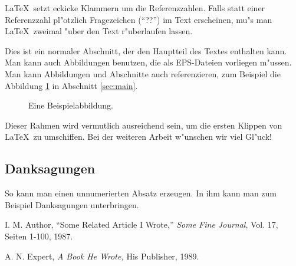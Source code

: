 \documentclass[10pt,twocolumn]{article}
\begin{document}
\LaTeX\ setzt eckicke Klammern um die Referenzzahlen. Falls 
statt einer Referenzzahl pl"otzlich Fragezeichen (``??'') im Text
erscheinen, mu"s man \LaTeX\ zweimal "uber den Text r"uberlaufen
lassen.

\label{sec:main}

Dies ist ein normaler Abschnitt, der den Hauptteil des Textes
enthalten kann. Man kann auch Abbildungen benutzen, die als
EPS-Dateien vorliegen m"ussen. Man kann Abbildungen und Abschnitte
auch referenzieren, zum Beispiel die Abbildung \ref{fig:sample} in
Abschnitt \ref{sec:main}.

\begin{figure}
  \begin{center}
    \leavevmode
    \caption{Eine Beispielabbildung.}
    \label{fig:sample}
  \end{center}
\end{figure}



Dieser Rahmen wird vermutlich ausreichend sein, um die ersten
Klippen von \LaTeX\ zu umschiffen. Bei der weiteren Arbeit w"unschen
wir viel Gl"uck!


\subsection*{Danksagungen}

So kann man einen unnumerierten Absatz erzeugen. In ihm kann man
zum Beispiel Danksagungen unterbringen.




\begin{thebibliography}{9}

I. M. Author, 
``Some Related Article I Wrote,''
{\em Some Fine Journal}, Vol. 17, Seiten 1-100, 1987.

A. N. Expert, 
{\em A Book He Wrote,}
His Publisher, 1989.

\end{thebibliography}
\end{document}
